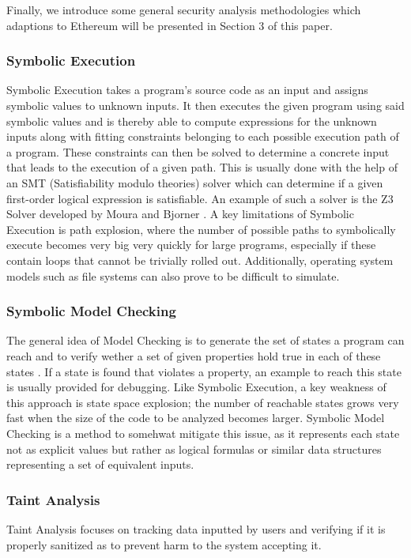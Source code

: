 \documentclass[letterpaper,twocolumn,10pt]{article}
\begin{document}
Finally, we introduce some general security analysis methodologies which adaptions to Ethereum will be presented in Section 3 of this paper.

\subsubsection{Symbolic Execution}

Symbolic Execution takes a program's source code as an input and assigns symbolic values to unknown inputs. It then executes the given program using said symbolic values and is thereby able to compute expressions for the unknown inputs along with fitting constraints belonging to each possible execution path of a program. These constraints can then be solved to determine a concrete input that leads to the execution of a given path. This is usually done with the help of an SMT (Satisfiability modulo theories) solver which can  determine if a given first-order logical expression is satisfiable. An example of such a solver is the Z3 Solver developed by Moura and Bjorner \cite{moura_bjorner_2008}. A key limitations of Symbolic Execution is path explosion, where the number of possible paths to symbolically execute becomes very big very quickly for large programs, especially if these contain loops that cannot be trivially rolled out. Additionally, operating system models such as file systems can also prove to be difficult to simulate.

\subsubsection{Symbolic Model Checking}
The general idea of Model Checking is to generate the set of states a program can reach and to verify wether a set of given properties hold true in each of these states \cite{osterland_rose_2020}. If a state is found that violates a property, an example to reach this state is usually provided for debugging. Like Symbolic Execution, a key weakness of this approach is state space explosion; the number of reachable states grows very fast when the size of the code to be analyzed becomes larger. Symbolic Model Checking is a method to somehwat mitigate this issue, as it represents each state not as explicit values but rather as logical formulas  or similar data structures representing a set of equivalent inputs.

\subsubsection{Taint Analysis}
Taint Analysis focuses on tracking data inputted by users and verifying if it is properly sanitized as to prevent harm to the system accepting it.
\end{document}
